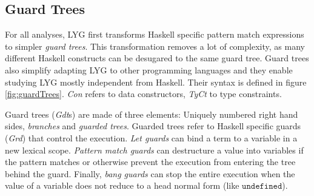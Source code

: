 \subsection{Guard Trees}

For all analyses, LYG first transforms Haskell specific pattern match expressions to simpler \textit{guard trees}.
This transformation removes a lot of complexity, as many different Haskell constructs can be desugared
to the same guard tree. Guard trees also simplify adapting LYG to other programming languages
and they enable studying LYG mostly independent from Haskell.
Their syntax is defined in figure \ref{fig:guardTrees}. \textit{Con} refers to data constructors, \textit{TyCt} to type constraints.

Guard trees (\textit{Gdt}s) are made of three elements: Uniquely numbered right hand sides, \textit{branches} and \textit{guarded trees}.
Guarded trees refer to Haskell specific guards (\textit{Grd}) that control the execution.
\textit{Let guards} can bind a term to a variable in a new lexical scope.
\textit{Pattern match guards} can destructure a value into variables if the pattern matches or otherwise prevent the
execution from entering the tree behind the guard.
Finally, \textit{bang guards} can stop the entire execution when the value of a variable does not reduce to a head normal form (like $\mathtt{undefined}$).

